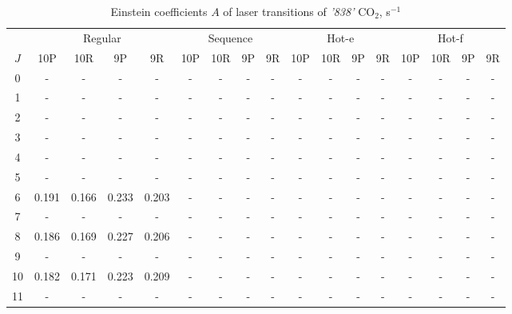 \documentclass{report}
\begin{document}
\begin{appendices}
\begin{sidewaystable}
\centering
\caption{Einstein coefficients $A$ of laser transitions of \textit{'838'} {CO$_2$}, s$^{-1}$}
\label{table:A838}
\scriptsize
\begin{tabular}{|c|cccc|cccc|cccc|cccc|}
\hline
& \multicolumn{4}{c|}{Regular}& \multicolumn{4}{c|}{Sequence}& \multicolumn{4}{c|}{Hot-e}& \multicolumn{4}{c|}{Hot-f}\\
$J$ & 10P & 10R & 9P & 9R & 10P & 10R & 9P & 9R & 10P & 10R & 9P & 9R & 10P & 10R & 9P & 9R\\ 
\hline
0  &   -   &   -   &   -   &   -   &   -   &   -   &   -   &   -   &   -   &   -   &   -   &   -   &   -   &   -   &   -   &   -   \\
1  &   -   &   -   &   -   &   -   &   -   &   -   &   -   &   -   &   -   &   -   &   -   &   -   &   -   &   -   &   -   &   -   \\
2  &   -   &   -   &   -   &   -   &   -   &   -   &   -   &   -   &   -   &   -   &   -   &   -   &   -   &   -   &   -   &   -   \\
3  &   -   &   -   &   -   &   -   &   -   &   -   &   -   &   -   &   -   &   -   &   -   &   -   &   -   &   -   &   -   &   -   \\
4  &   -   &   -   &   -   &   -   &   -   &   -   &   -   &   -   &   -   &   -   &   -   &   -   &   -   &   -   &   -   &   -   \\
5  &   -   &   -   &   -   &   -   &   -   &   -   &   -   &   -   &   -   &   -   &   -   &   -   &   -   &   -   &   -   &   -   \\
6  & 0.191 & 0.166 & 0.233 & 0.203 &   -   &   -   &   -   &   -   &   -   &   -   &   -   &   -   &   -   &   -   &   -   &   -   \\
7  &   -   &   -   &   -   &   -   &   -   &   -   &   -   &   -   &   -   &   -   &   -   &   -   &   -   &   -   &   -   &   -   \\
8  & 0.186 & 0.169 & 0.227 & 0.206 &   -   &   -   &   -   &   -   &   -   &   -   &   -   &   -   &   -   &   -   &   -   &   -   \\
9  &   -   &   -   &   -   &   -   &   -   &   -   &   -   &   -   &   -   &   -   &   -   &   -   &   -   &   -   &   -   &   -   \\
10 & 0.182 & 0.171 & 0.223 & 0.209 &   -   &   -   &   -   &   -   &   -   &   -   &   -   &   -   &   -   &   -   &   -   &   -   \\
11 &   -   &   -   &   -   &   -   &   -   &   -   &   -   &   -   &   -   &   -   &   -   &   -   &   -   &   -   &   -   &   -   \\

\end{tabular}
\end{sidewaystable}
\end{appendices}
\end{document}
